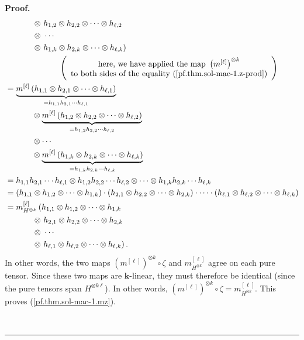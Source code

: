 \documentclass[numbers=enddot,12pt,final,onecolumn,notitlepage]{scrartcl}%
\theoremstyle{definition}
\newenvironment{proof}[1][Proof]{\noindent\textbf{#1.} }{\ \rule{0.5em}{0.5em}}
\begin{document}
\begin{proof}
{\begin{align*}
&  \ \ \ \ \ \ \ \ \ \ \left.  \otimes\ h_{1,2}\otimes h_{2,2}\otimes
\cdots\otimes h_{\ell,2}\right. \\
&  \ \ \ \ \ \ \ \ \ \ \left.  \otimes\ \cdots\right. \\
&  \ \ \ \ \ \ \ \ \ \ \left.  \otimes\ h_{1,k}\otimes h_{2,k}\otimes
\cdots\otimes h_{\ell,k}\right) \\
&  \ \ \ \ \ \ \ \ \ \ \ \ \ \ \ \ \ \ \ \ \left(
\begin{array}
[c]{c}%
\text{here, we have applied the map }\left(  m^{\left[  \ell\right]  }\right)
^{\otimes k}\\
\text{to both sides of the equality (\ref{pf.thm.sol-mac-1.z-prod})}%
\end{array}
\right) \\
&  =\underbrace{m^{\left[  \ell\right]  }\left(  h_{1,1}\otimes h_{2,1}%
\otimes\cdots\otimes h_{\ell,1}\right)  }_{=h_{1,1}h_{2,1}\cdots h_{\ell,1}}\\
&  \ \ \ \ \ \ \ \ \ \ \otimes\underbrace{m^{\left[  \ell\right]  }\left(
h_{1,2}\otimes h_{2,2}\otimes\cdots\otimes h_{\ell,2}\right)  }_{=h_{1,2}%
h_{2,2}\cdots h_{\ell,2}}\\
&  \ \ \ \ \ \ \ \ \ \ \otimes\cdots\\
&  \ \ \ \ \ \ \ \ \ \ \otimes\underbrace{m^{\left[  \ell\right]  }\left(
h_{1,k}\otimes h_{2,k}\otimes\cdots\otimes h_{\ell,k}\right)  }_{=h_{1,k}%
h_{2,k}\cdots h_{\ell,k}}\\
&  =h_{1,1}h_{2,1}\cdots h_{\ell,1}\otimes h_{1,2}h_{2,2}\cdots h_{\ell
,2}\otimes\cdots\otimes h_{1,k}h_{2,k}\cdots h_{\ell,k}\\
&  =\left(  h_{1,1}\otimes h_{1,2}\otimes\cdots\otimes h_{1,k}\right)
\cdot\left(  h_{2,1}\otimes h_{2,2}\otimes\cdots\otimes h_{2,k}\right)
\cdot\cdots\cdot\left(  h_{\ell,1}\otimes h_{\ell,2}\otimes\cdots\otimes
h_{\ell,k}\right) \\
&  =m_{H^{\otimes k}}^{\left[  \ell\right]  }\left(  h_{1,1}\otimes
h_{1,2}\otimes\cdots\otimes h_{1,k}\right. \\
&  \ \ \ \ \ \ \ \ \ \ \left.  \otimes\ h_{2,1}\otimes h_{2,2}\otimes
\cdots\otimes h_{2,k}\right. \\
&  \ \ \ \ \ \ \ \ \ \ \left.  \otimes\ \cdots\right. \\
&  \ \ \ \ \ \ \ \ \ \ \left.  \otimes\ h_{\ell,1}\otimes h_{\ell,2}%
\otimes\cdots\otimes h_{\ell,k}\right)  .
\end{align*}
In other words, the two maps $\left(  m^{\left[  \ell\right]  }\right)
^{\otimes k}\circ\zeta$ and $m_{H^{\otimes k}}^{\left[  \ell\right]  }$ agree
on each pure tensor. Since these two maps are $\mathbf{k}$-linear, they must
therefore be identical (since the pure tensors span $H^{\otimes k\ell}$). In
other words, $\left(  m^{\left[  \ell\right]  }\right)  ^{\otimes k}\circ
\zeta=m_{H^{\otimes k}}^{\left[  \ell\right]  }$. This proves
(\ref{pf.thm.sol-mac-1.mz}).}


\end{proof}
\end{document}
